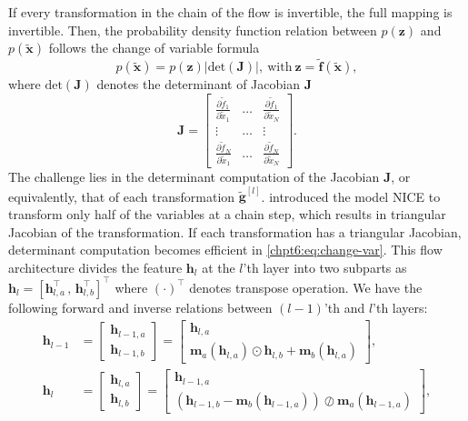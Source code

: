 If every transformation in the chain of the flow is invertible, the full mapping is invertible.
Then, the probability density function relation between $p(\bm{z})$ and $p(\tilde{\bm{x}})$ follows the change of variable formula
\begin{equation}\label{chpt6:eq:change-var}
  p(\tilde{\bm{x}}) =  p(\bm{z}) \big| \mathrm{det}(\bm{J}) \big|, ~\mathrm{with}~ {\bm{z}=\tilde{\bm{f}}(\tilde{\bm{x}})},
\end{equation}
where $\mathrm{det}(\bm{J})$ denotes the determinant of Jacobian $\bm{J}$
\begin{equation}
  \bm{J} = \left[
    \begin{array}{ccc}
      \frac{\partial \tilde{f}_1}{\partial \tilde{x}_1} & \hdots & \frac{\partial \tilde{f}_1}{\partial \tilde{x}_N} \\
      \vdots & \hdots & \vdots \\
      \frac{\partial \tilde{f}_N}{\partial \tilde{x}_1} & \hdots & \frac{\partial \tilde{f}_N}{\partial \tilde{x}_N}
    \end{array}
  \right].
\end{equation}
The challenge lies in the determinant computation of the Jacobian $\bm{J}$, or equivalently, that of each transformation $\tilde{\bm{g}}^{[l]}$. \cite{DBLP:journals/corr/DinhKB14} introduced the model NICE to transform only half of the variables at a chain step, which results in triangular Jacobian of the transformation. If each transformation has a triangular Jacobian, determinant computation becomes efficient in \eqref{chpt6:eq:change-var}.
This flow architecture divides the feature $\bm{h}_l$ at the $l$'th layer into two subparts as
$\bm{h}_l = [\bm{h}_{l,a}^{\intercal} \, , \, \bm{h}_{l,b}^{\intercal}]^{\intercal}$ where
$(\cdot)^{\intercal}$ denotes transpose operation. We have the following forward and inverse relations between $(l-1)$'th and $l$'th layers:
\begin{align}\label{chpt6:eq-gl-coupling}
  \bm{h}_{l-1} &=
                 \begin{bmatrix}
                   \bm{h}_{l-1,a}\\
                   \bm{h}_{l-1,b}
                 \end{bmatrix}
  =
  \begin{bmatrix}
    \bm{h}_{l,a}\\
    \bm{m}_a(\bm{h}_{l,a})\odot \bm{h}_{l,b} + \bm{m}_b(\bm{h}_{l,a})
  \end{bmatrix},\nonumber\\
  \bm{h}_{l} &=
               \begin{bmatrix}
                 \bm{h}_{l,a}\\
                 \bm{h}_{l,b}
               \end{bmatrix}
  =
  \begin{bmatrix}
    \bm{h}_{l-1,a}\\
    \left(  \bm{h}_{l-1,b} - \bm{m}_b(\bm{h}_{l-1,a}) \right)\oslash \bm{m}_a(\bm{h}_{l-1,a}) 
  \end{bmatrix}, 
\end{align}
